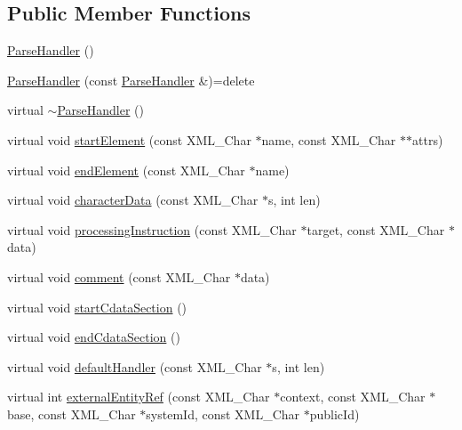 \subsection*{Public Member Functions}
\begin{DoxyCompactItemize}
\item 
\hyperlink{class_expat_1_1_parse_handler_a0d1e9403a9de36e7f9864a0f665b8b65}{Parse\+Handler} ()
\item 
\hyperlink{class_expat_1_1_parse_handler_a2757b8dca21b50bc9ff8298591cfb6a6}{Parse\+Handler} (const \hyperlink{class_expat_1_1_parse_handler}{Parse\+Handler} \&)=delete
\item 
virtual \hyperlink{class_expat_1_1_parse_handler_a188f81926a657b5231fc4a60a5905701}{$\sim$\+Parse\+Handler} ()
\item 
virtual void \hyperlink{class_expat_1_1_parse_handler_aa6b631d6e771281fb965881545ebacfa}{start\+Element} (const X\+M\+L\+\_\+\+Char $\ast$name, const X\+M\+L\+\_\+\+Char $\ast$$\ast$attrs)
\item 
virtual void \hyperlink{class_expat_1_1_parse_handler_a13c775fa36138b4ee429e10b93177bec}{end\+Element} (const X\+M\+L\+\_\+\+Char $\ast$name)
\item 
virtual void \hyperlink{class_expat_1_1_parse_handler_af3f6effd1ab8b85ec007b981f83d130e}{character\+Data} (const X\+M\+L\+\_\+\+Char $\ast$s, int len)
\item 
virtual void \hyperlink{class_expat_1_1_parse_handler_a7ede3019b6e3eba355504bc34f0143d9}{processing\+Instruction} (const X\+M\+L\+\_\+\+Char $\ast$target, const X\+M\+L\+\_\+\+Char $\ast$data)
\item 
virtual void \hyperlink{class_expat_1_1_parse_handler_a1a4635db36fc5f7abae3deb6ea47becc}{comment} (const X\+M\+L\+\_\+\+Char $\ast$data)
\item 
virtual void \hyperlink{class_expat_1_1_parse_handler_aa839f673fa3b34090b3a6d4341da7df8}{start\+Cdata\+Section} ()
\item 
virtual void \hyperlink{class_expat_1_1_parse_handler_a63611532e55e95c43d074846fdc73314}{end\+Cdata\+Section} ()
\item 
virtual void \hyperlink{class_expat_1_1_parse_handler_a652aca387f4ed68e0178e89b75adb651}{default\+Handler} (const X\+M\+L\+\_\+\+Char $\ast$s, int len)
\item 
virtual int \hyperlink{class_expat_1_1_parse_handler_a54f2787ed9c5134d4a6bf7748a23c3cf}{external\+Entity\+Ref} (const X\+M\+L\+\_\+\+Char $\ast$context, const X\+M\+L\+\_\+\+Char $\ast$base, const X\+M\+L\+\_\+\+Char $\ast$system\+Id, const X\+M\+L\+\_\+\+Char $\ast$public\+Id)
$$
\end{DoxyCompactItemize}

